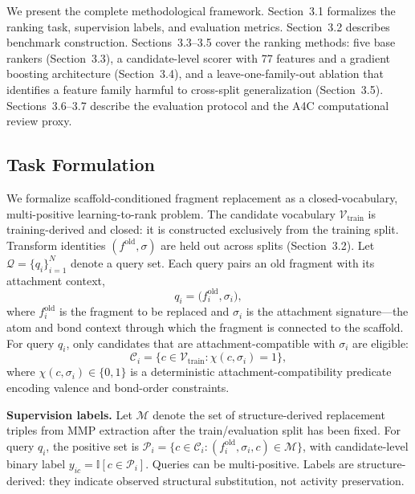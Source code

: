 \documentclass[12pt,letterpaper]{article}
\begin{document}
We present the complete methodological framework. Section~3.1 formalizes the ranking task, supervision labels, and evaluation metrics. Section~3.2 describes benchmark construction. Sections~3.3--3.5 cover the ranking methods: five base rankers (Section~3.3), a candidate-level scorer with 77 features and a gradient boosting architecture (Section~3.4), and a leave-one-family-out ablation that identifies a feature family harmful to cross-split generalization (Section~3.5). Sections~3.6--3.7 describe the evaluation protocol and the A4C computational review proxy.

\subsection{Task Formulation}

We formalize scaffold-conditioned fragment replacement as a closed-vocabulary, multi-positive learning-to-rank problem. The candidate vocabulary $\mathcal{V}_{\mathrm{train}}$ is training-derived and closed: it is constructed exclusively from the training split. Transform identities $(f^{\mathrm{old}}, \sigma)$ are held out across splits (Section~3.2). Let $\mathcal{Q} = \{q_i\}_{i=1}^{N}$ denote a query set. Each query pairs an old fragment with its attachment context,
%
\begin{equation}
q_i = \bigl(f_i^{\mathrm{old}}, \sigma_i\bigr),
\end{equation}
%
where $f_i^{\mathrm{old}}$ is the fragment to be replaced and $\sigma_i$ is the attachment signature---the atom and bond context through which the fragment is connected to the scaffold. For query $q_i$, only candidates that are attachment-compatible with $\sigma_i$ are eligible:
%
\begin{equation}
\mathcal{C}_i = \bigl\{c\in\mathcal{V}_{\mathrm{train}}:\chi(c,\sigma_i)=1\bigr\},
\end{equation}
%
where $\chi(c,\sigma_i)\in\{0,1\}$ is a deterministic attachment-compatibility predicate encoding valence and bond-order constraints.

\textbf{Supervision labels.}
Let $\mathcal{M}$ denote the set of structure-derived replacement triples from MMP extraction after the train/evaluation split has been fixed. For query $q_i$, the positive set is $\mathcal{P}_i = \{c\in\mathcal{C}_i: (f_i^{\mathrm{old}},\sigma_i,c)\in\mathcal{M}\}$, with candidate-level binary label $y_{ic} = \mathbb{I}[c\in\mathcal{P}_i]$. Queries can be multi-positive. Labels are structure-derived: they indicate observed structural substitution, not activity preservation.
\end{document}
